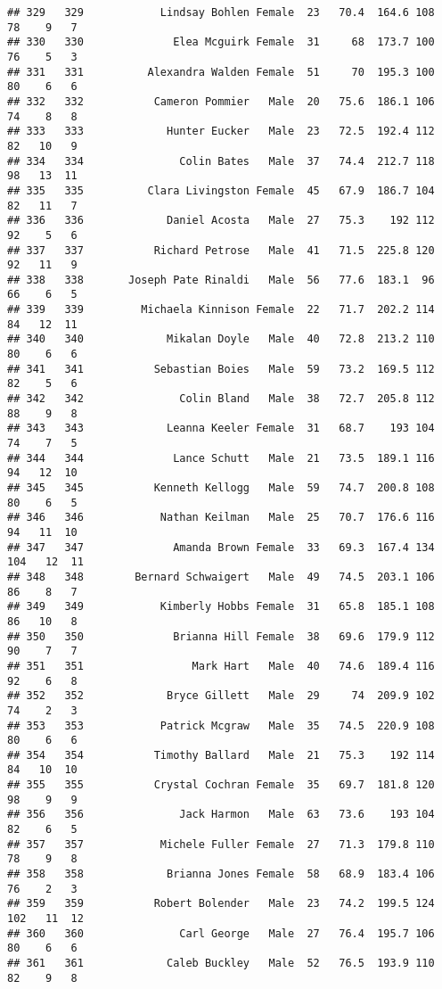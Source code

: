 \documentclass[
]{article}
\begin{document}
\begin{verbatim}
## 329   329            Lindsay Bohlen Female  23   70.4  164.6 108  78    9   7
## 330   330              Elea Mcguirk Female  31     68  173.7 100  76    5   3
## 331   331          Alexandra Walden Female  51     70  195.3 100  80    6   6
## 332   332           Cameron Pommier   Male  20   75.6  186.1 106  74    8   8
## 333   333             Hunter Eucker   Male  23   72.5  192.4 112  82   10   9
## 334   334               Colin Bates   Male  37   74.4  212.7 118  98   13  11
## 335   335          Clara Livingston Female  45   67.9  186.7 104  82   11   7
## 336   336             Daniel Acosta   Male  27   75.3    192 112  92    5   6
## 337   337           Richard Petrose   Male  41   71.5  225.8 120  92   11   9
## 338   338       Joseph Pate Rinaldi   Male  56   77.6  183.1  96  66    6   5
## 339   339         Michaela Kinnison Female  22   71.7  202.2 114  84   12  11
## 340   340             Mikalan Doyle   Male  40   72.8  213.2 110  80    6   6
## 341   341           Sebastian Boies   Male  59   73.2  169.5 112  82    5   6
## 342   342               Colin Bland   Male  38   72.7  205.8 112  88    9   8
## 343   343             Leanna Keeler Female  31   68.7    193 104  74    7   5
## 344   344              Lance Schutt   Male  21   73.5  189.1 116  94   12  10
## 345   345           Kenneth Kellogg   Male  59   74.7  200.8 108  80    6   5
## 346   346            Nathan Keilman   Male  25   70.7  176.6 116  94   11  10
## 347   347              Amanda Brown Female  33   69.3  167.4 134 104   12  11
## 348   348        Bernard Schwaigert   Male  49   74.5  203.1 106  86    8   7
## 349   349            Kimberly Hobbs Female  31   65.8  185.1 108  86   10   8
## 350   350              Brianna Hill Female  38   69.6  179.9 112  90    7   7
## 351   351                 Mark Hart   Male  40   74.6  189.4 116  92    6   8
## 352   352             Bryce Gillett   Male  29     74  209.9 102  74    2   3
## 353   353            Patrick Mcgraw   Male  35   74.5  220.9 108  80    6   6
## 354   354           Timothy Ballard   Male  21   75.3    192 114  84   10  10
## 355   355           Crystal Cochran Female  35   69.7  181.8 120  98    9   9
## 356   356               Jack Harmon   Male  63   73.6    193 104  82    6   5
## 357   357            Michele Fuller Female  27   71.3  179.8 110  78    9   8
## 358   358             Brianna Jones Female  58   68.9  183.4 106  76    2   3
## 359   359           Robert Bolender   Male  23   74.2  199.5 124 102   11  12
## 360   360               Carl George   Male  27   76.4  195.7 106  80    6   6
## 361   361             Caleb Buckley   Male  52   76.5  193.9 110  82    9   8

\end{verbatim}
\end{document}
